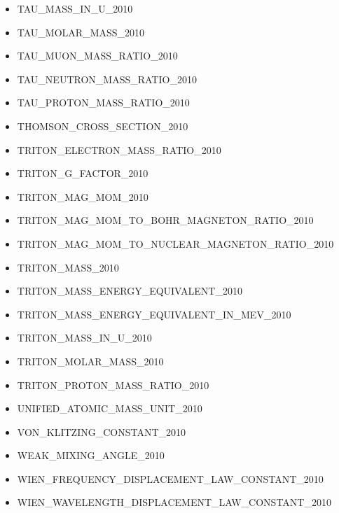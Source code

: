 \begin{itemize}
\item TAU\_MASS\_IN\_U\_2010
\item TAU\_MOLAR\_MASS\_2010
\item TAU\_MUON\_MASS\_RATIO\_2010
\item TAU\_NEUTRON\_MASS\_RATIO\_2010
\item TAU\_PROTON\_MASS\_RATIO\_2010
\item THOMSON\_CROSS\_SECTION\_2010
\item TRITON\_ELECTRON\_MASS\_RATIO\_2010
\item TRITON\_G\_FACTOR\_2010
\item TRITON\_MAG\_MOM\_2010
\item TRITON\_MAG\_MOM\_TO\_BOHR\_MAGNETON\_RATIO\_2010
\item TRITON\_MAG\_MOM\_TO\_NUCLEAR\_MAGNETON\_RATIO\_2010
\item TRITON\_MASS\_2010
\item TRITON\_MASS\_ENERGY\_EQUIVALENT\_2010
\item TRITON\_MASS\_ENERGY\_EQUIVALENT\_IN\_MEV\_2010
\item TRITON\_MASS\_IN\_U\_2010
\item TRITON\_MOLAR\_MASS\_2010
\item TRITON\_PROTON\_MASS\_RATIO\_2010
\item UNIFIED\_ATOMIC\_MASS\_UNIT\_2010
\item VON\_KLITZING\_CONSTANT\_2010
\item WEAK\_MIXING\_ANGLE\_2010
\item WIEN\_FREQUENCY\_DISPLACEMENT\_LAW\_CONSTANT\_2010
\item WIEN\_WAVELENGTH\_DISPLACEMENT\_LAW\_CONSTANT\_2010
\end{itemize}
